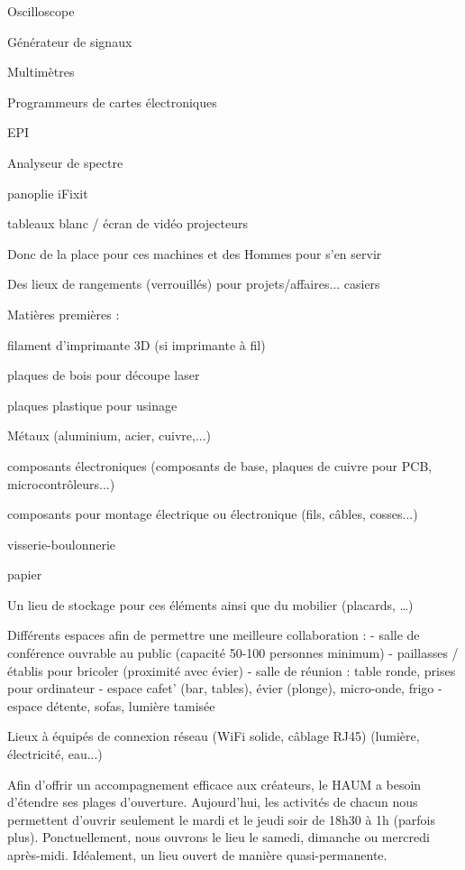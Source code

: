 \documentclass[a4paper,10pt]{scrartcl}
\begin{document}
    Oscilloscope

    Générateur de signaux

    Multimètres

    Programmeurs de cartes électroniques

    EPI

    Analyseur de spectre

    panoplie iFixit

    tableaux blanc / écran de vidéo projecteurs

    
Donc de la place pour ces machines et des Hommes pour s'en servir

Des lieux de rangements (verrouillés) pour projets/affaires... casiers

Matières premières :

    filament d'imprimante 3D (si imprimante à fil)

    plaques de bois pour découpe laser 

    plaques plastique pour usinage

    Métaux (aluminium, acier, cuivre,...)

    composants électroniques (composants de base, plaques de cuivre pour PCB, microcontrôleurs...) 

    composants pour montage électrique ou électronique (fils, câbles, cosses...)

    visserie-boulonnerie

    papier


Un lieu de stockage pour ces éléments ainsi que du mobilier (placards, …)

Différents espaces afin de permettre une meilleure collaboration : 
    - salle de conférence ouvrable au public (capacité 50-100 personnes minimum)
    - paillasses / établis pour bricoler (proximité avec évier)
    - salle de réunion : table ronde, prises pour ordinateur
    - espace cafet' (bar, tables), évier (plonge), micro-onde, frigo
    - espace détente, sofas, lumière tamisée

Lieux à équipés de connexion réseau (WiFi solide, câblage RJ45) (lumière, électricité, eau...)

Afin d'offrir un accompagnement efficace aux créateurs, le HAUM a besoin d'étendre ses plages d'ouverture. Aujourd'hui, les activités de chacun nous permettent d'ouvrir seulement le mardi et le jeudi soir de 18h30 à 1h (parfois plus). Ponctuellement, nous ouvrons le lieu le samedi, dimanche ou mercredi après-midi.
Idéalement, un lieu ouvert de manière quasi-permanente.
\end{document}

